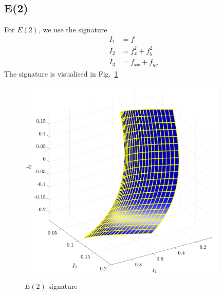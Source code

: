 \documentclass[11pt]{article}
\begin{document}
\subsection{E(2)}
For $E(2)$, we use the signature
\begin{equation}\label{eq:e2sig}
  \begin{split}
    I_1 &= f \\
    I_2 &= f_x^2 + f_y^2 \\
    I_3 &= f_{xx} + f_{yy}
  \end{split}
\end{equation}
The signature is visualised in Fig.~\ref{fig:e2signature}
\begin{figure}
  \centering
    \includegraphics[width=10cm]{figures/E2_signature}
  \caption{$E(2)$ signature}
  \label{fig:e2signature}
\end{figure}
\end{document}
